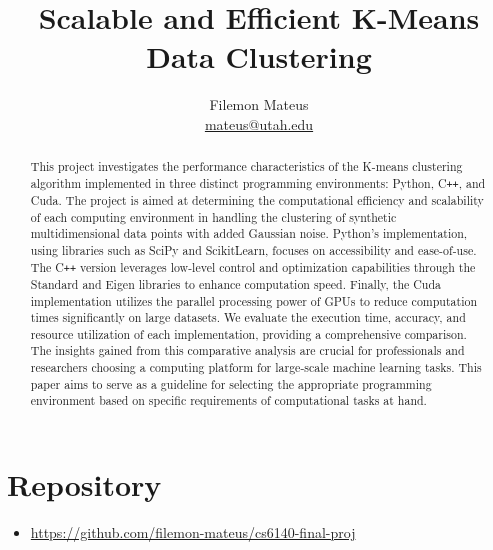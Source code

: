 \documentclass{article}
\title{
  \bf\sffamily
  Scalable and Efficient K-Means Data Clustering
}
\author{
  Filemon Mateus \\
  \href{mailto:mateus@utah.edu}{\setfontsize{10}\url{mateus@utah.edu}}
}
\date{}
\begin{document}
  \maketitle
  \thispagestyle{fancy}

  \begin{abstract}
    This project investigates the performance characteristics of the
    {\sc K-means} clustering algorithm implemented in three distinct
    programming environments: {\sc Python}, {\sc C{\tt ++}}, and {\sc Cuda}.
    The project is aimed at determining the computational efficiency and
    scalability of each computing environment in handling the clustering of
    synthetic multidimensional data points with added Gaussian noise.
    {\sc Python}'s implementation, using libraries such as {\sc SciPy} and
    {\sc ScikitLearn}, focuses on accessibility and ease-of-use. The
    {\sc C{\tt ++}} version leverages low-level control and optimization
    capabilities through the {\sc Standard} and {\sc Eigen} libraries to
    enhance computation speed. Finally, the {\sc Cuda} implementation
    utilizes the parallel processing power of {\sc GPUs} to reduce
    computation times significantly on large datasets. We evaluate the
    execution time, accuracy, and resource utilization of each implementation,
    providing a comprehensive comparison. The insights gained from this
    comparative analysis are crucial for professionals and researchers
    choosing a computing platform for large-scale machine learning tasks.
    This paper aims to serve as a guideline for selecting the appropriate
    programming environment based on specific requirements of computational
    tasks at hand.
  \end{abstract}


  \section{Repository}
  \begin{itemize}[label={---}]
    \item \url{https://github.com/filemon-mateus/cs6140-final-proj}
  \end{itemize}
\end{document}
